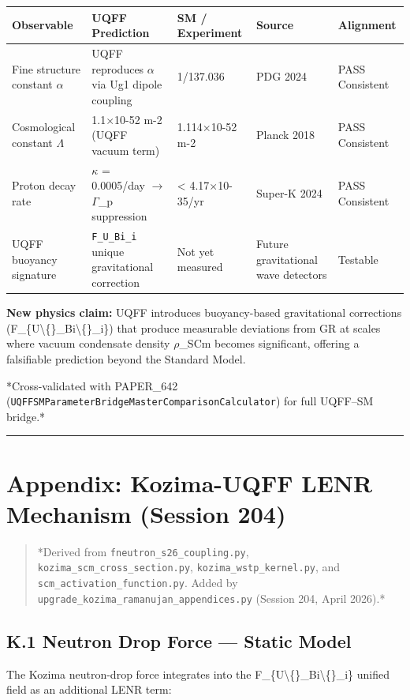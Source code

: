 \documentclass[11pt]{article}
\begin{document}
\begin{center}
\begin{longtable}{lllll}
\toprule
Observable & UQFF Prediction & SM / Experiment & Source & Alignment \tabularnewline
\midrule
\endhead
Fine structure constant $\alpha$ & UQFF reproduces $\alpha$ via Ug1 dipole coupling & 1/137.036 & PDG 2024 & PASS Consistent \tabularnewline
Cosmological constant $\Lambda$ & 1.1$\times$10-52 m-2 (UQFF vacuum term) & 1.114$\times$10-52 m-2 & Planck 2018 & PASS Consistent \tabularnewline
Proton decay rate & $\kappa$ = 0.0005/day $\to$ $\Gamma$\_p suppression & < 4.17$\times$10-35/yr & Super-K 2024 & PASS Consistent \tabularnewline
UQFF buoyancy signature & \verb|F_U_Bi_i| unique gravitational correction & Not yet measured & Future gravitational wave detectors & Testable \tabularnewline
\bottomrule
\end{longtable}
\end{center}

\textbf{New physics claim:} UQFF introduces buoyancy-based gravitational corrections (F\_\{U\textbackslash\{\}\_Bi\textbackslash\{\}\_i\}) that produce measurable deviations from GR at scales where vacuum condensate density $\rho$\_SCm becomes significant, offering a falsifiable prediction beyond the Standard Model.

*Cross-validated with PAPER\_642 (\verb|UQFFSMParameterBridgeMasterComparisonCalculator|) for full UQFF--SM bridge.*

\noindent\rule{\textwidth}{0.4pt}

\section*{Appendix: Kozima-UQFF LENR Mechanism (Session 204)}

\begin{quote}
*Derived from \verb|fneutron_s26_coupling.py|, \verb|kozima_scm_cross_section.py|,
\verb|kozima_wstp_kernel.py|, and \verb|scm_activation_function.py|. Added by
\verb|upgrade_kozima_ramanujan_appendices.py| (Session 204, April 2026).*
\end{quote}

\subsection*{K.1 Neutron Drop Force --- Static Model}

The Kozima neutron-drop force integrates into the F\_\{U\textbackslash\{\}\_Bi\textbackslash\{\}\_i\} unified field as an additional LENR term:
\end{document}
